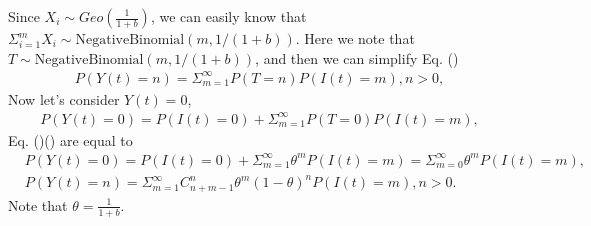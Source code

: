 \documentclass[a4paper,10pt]{article}
\begin{document}
Since $X_i\sim Geo(\frac{1}{1+b})$, we can easily know that $\Sigma_{i=1}^m X_i\sim \text{NegativeBinomial}(m,1/(1+b))$. Here we note that $T\sim \text{NegativeBinomial}(m,1/(1+b))$, and then we can simplify Eq. ()
\begin{equation}
	\begin{aligned}\label{Y_n}
		P(Y(t)=n)=\Sigma_{m=1}^\infty P(T=n)P(I(t)=m),n>0,
	\end{aligned}
\end{equation}
Now let's consider $Y(t)=0$,
\begin{equation}
	\begin{aligned}\label{Y_0}
	P(Y(t)=0)=P(I(t)=0)+\Sigma_{m=1}^\infty P(T=0)P(I(t)=m),
	\end{aligned}
\end{equation}
Eq. ()() are equal to
\begin{equation}
	\begin{aligned}
	&P(Y(t)=0)=P(I(t)=0)+\Sigma_{m=1}^\infty\theta^m P(I(t)=m)=\Sigma_{m=0}^\infty\theta^m P(I(t)=m),	\\
	&P(Y(t)=n)=\Sigma_{m=1}^\infty C^n_{n+m-1} \theta^m(1-\theta)^n P(I(t)=m),n>0.
	\end{aligned}
\end{equation}
Note that $\theta=\frac{1}{1+b}$.
\newpage



\end{document}

